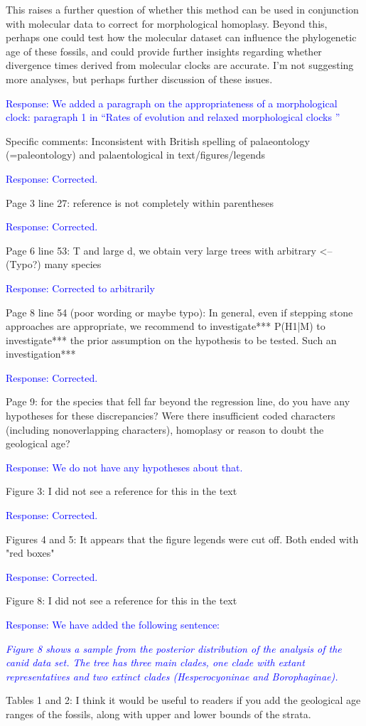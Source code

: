 \documentclass[11pt]{article}
\newcommand{\response}[1]{\medskip{}\textcolor{blue}{{Response: #1}}\medskip{}}
\newcommand{\respquote}[1]{{\medskip{}\textcolor{blue}{{\it #1}}\medskip{}}}
\begin{document}
This raises a further question of whether this method can be used in conjunction with molecular data to correct for morphological homoplasy. Beyond this, perhaps one could test how the molecular dataset can influence the phylogenetic age of these fossils, and could provide further insights regarding whether divergence times derived from molecular clocks are accurate. I'm not suggesting more analyses, but perhaps further discussion of these issues.

\response{We added a paragraph on the appropriateness of a morphological clock: paragraph 1 in ``Rates of evolution and relaxed morphological clocks
''}

Specific comments:
Inconsistent with British spelling of palaeontology (=paleontology) and palaentological in text/figures/legends

\response{Corrected.}

Page 3 line 27: reference is not completely within parentheses

\response{Corrected.}

Page 6 line 53: T and large d, we obtain very large trees with arbitrary <--(Typo?) many species

\response{Corrected to arbitrarily}

Page 8 line 54 (poor wording or maybe typo): In general, even if stepping stone approaches are appropriate, we recommend to investigate*** P(H1|M) to investigate*** the prior assumption on the hypothesis to be tested. Such an investigation***

\response{Corrected.}

Page 9: for the species that fell far beyond the regression line, do you have any hypotheses for these discrepancies? Were there insufficient coded characters (including nonoverlapping characters), homoplasy or reason to doubt the geological age?

\response{We do not have any hypotheses about that.}

Figure 3: I did not see a reference for this in the text

\response{Corrected.}

Figures 4 and 5: It appears that the figure legends were cut off. Both ended with "red boxes"

\response{Corrected.}

Figure 8: I did not see a reference for this in the text

\response{We have added the following sentence:}

\respquote{Figure 8 shows a sample from the posterior distribution of the analysis of the canid data set. The tree has three main clades, one clade with extant representatives and two extinct clades ({\it Hesperocyoninae} and {\it Borophaginae}). 
}

Tables 1 and 2: I think it would be useful to readers if you add the geological age ranges of the fossils, along with upper and lower bounds of the strata.




\end{document}

